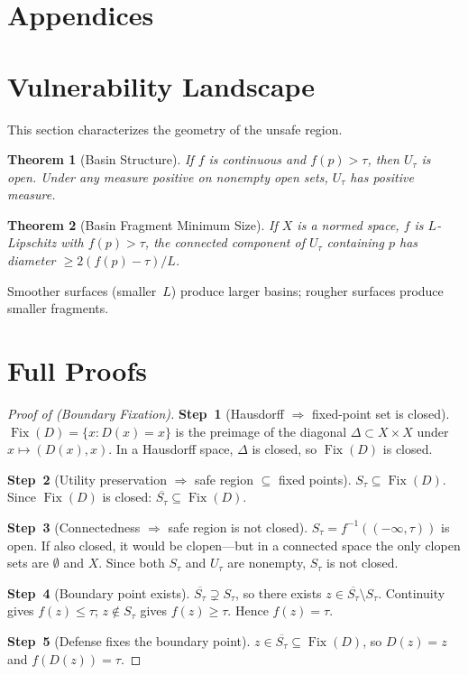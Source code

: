 \documentclass{article}
\newtheorem{theorem}{Theorem}[section]
\newcommand{\cl}[1]{\overline{#1}}
\newcommand{\Fix}{\operatorname{Fix}}
\begin{document}
\appendix
\section*{Appendices}

\section{Vulnerability Landscape}
\label{app:landscape}

This section characterizes the geometry of the unsafe region.

\begin{theorem}[Basin Structure]
\label{thm:basin}
If $f$ is continuous and $f(p)>\tau$, then $U_\tau$ is open. Under
any measure positive on nonempty open sets, $U_\tau$ has positive
measure.
\end{theorem}

\begin{theorem}[Basin Fragment Minimum Size]
\label{thm:fragment}
If $X$ is a normed space, $f$ is $L$-Lipschitz with $f(p) > \tau$,
the connected component of $U_\tau$ containing $p$ has diameter
$\geq 2(f(p) - \tau)/L$.
\end{theorem}

Smoother surfaces (smaller~$L$) produce larger basins; rougher
surfaces produce smaller fragments.

\section{Full Proofs}
\label{app:proofs}

\begin{proof}[Proof of  (Boundary Fixation)]
\textbf{Step~1} (Hausdorff $\Rightarrow$ fixed-point set is closed).
$\Fix(D) = \{x : D(x) = x\}$ is the preimage of the diagonal
$\Delta \subset X \times X$ under $x \mapsto (D(x), x)$. In a
Hausdorff space, $\Delta$ is closed, so $\Fix(D)$ is closed.

\textbf{Step~2} (Utility preservation $\Rightarrow$ safe region
$\subseteq$ fixed points).
$S_\tau \subseteq \Fix(D)$. Since $\Fix(D)$ is closed:
$\cl{S_\tau} \subseteq \Fix(D)$.

\textbf{Step~3} (Connectedness $\Rightarrow$ safe region is not closed).
$S_\tau = f^{-1}((-\infty,\tau))$ is open. If also closed, it would be
clopen---but in a connected space the only clopen sets are $\emptyset$
and $X$. Since both $S_\tau$ and $U_\tau$ are nonempty, $S_\tau$ is not
closed.

\textbf{Step~4} (Boundary point exists).
$\cl{S_\tau} \supsetneq S_\tau$, so there exists
$z \in \cl{S_\tau} \setminus S_\tau$. Continuity gives
$f(z) \leq \tau$; $z \notin S_\tau$ gives $f(z) \geq \tau$. Hence
$f(z) = \tau$.

\textbf{Step~5} (Defense fixes the boundary point).
$z \in \cl{S_\tau} \subseteq \Fix(D)$, so $D(z) = z$ and
$f(D(z)) = \tau$.
\end{proof}
\end{document}
